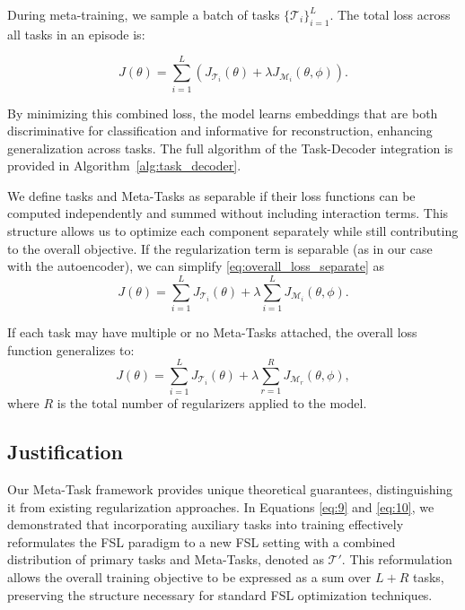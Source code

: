 During meta-training, we sample a batch of tasks $\{\mathcal{T}_i\}^L_{i=1}$. The total loss across all tasks in an episode is:

\begin{equation}\label{eq:overall_loss_separate}
J(\theta) = \sum_{i=1}^{L} \left(J_{\mathcal{T}_i}(\theta) + \lambda J_{{\mathcal{M}_i}}(\theta, \phi)\right).
\end{equation}

By minimizing this combined loss, the model learns embeddings that are both discriminative for classification and informative for reconstruction, enhancing generalization across tasks. The full algorithm of the Task-Decoder integration is provided in Algorithm~\ref{alg:task_decoder}.

We define tasks and Meta-Tasks as separable if their loss functions can be computed independently and summed without including interaction terms. This structure allows us to optimize each component separately while still contributing to the overall objective. If the regularization term is separable (as in our case with the autoencoder), we can simplify \eqref{eq:overall_loss_separate} as
\begin{equation}\label{eq:9}
J(\theta) = \sum_{i=1}^{L} J_{\mathcal{T}_i}(\theta) +\lambda\sum_{i=1}^{L}J_{{\mathcal{M}_i}}(\theta,\phi).
\end{equation}

If each task may have multiple or no Meta-Tasks attached, the overall loss function generalizes to:
\begin{equation}\label{eq:10}
J(\theta) = \sum_{i=1}^{L} J_{\mathcal{T}_i}(\theta) +\lambda\sum_{r=1}^{R}J_{{\mathcal{M}_r}}(\theta,\phi),
\end{equation}
where $R$ is the total number of regularizers applied to the model.

\subsection{Justification}

Our Meta-Task framework provides unique theoretical guarantees, distinguishing it from existing regularization approaches. In Equations \eqref{eq:9} and \eqref{eq:10}, we demonstrated that incorporating auxiliary tasks into training effectively reformulates the FSL paradigm to a new FSL setting with a combined distribution of primary tasks and Meta-Tasks, denoted as 
$\mathcal{T}'$. This reformulation allows the overall training objective to be expressed as a sum over $L+R$ tasks, preserving the structure necessary for standard FSL optimization techniques.

